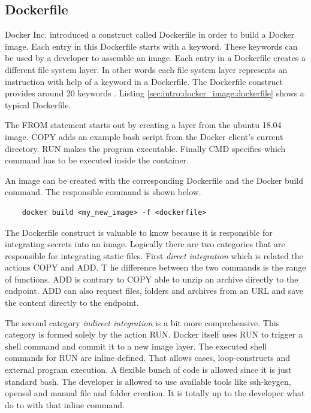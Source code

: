 \subsection{Dockerfile}
\label{sec:intro:docker_image:docker_img:dockerfile}
Docker Inc. introduced a construct called Dockerfile in order to build a Docker image.
Each entry in this Dockerfile starts with a keyword. 
These keywords can be used by a developer to assemble an image. 
Each entry in a Dockerfile creates a different file system layer. 
In other words each file system layer represents an instruction with help of a keyword in a Dockerfile.
The Dockerfile construct provides around 20 keywords \cite{dockerfile_ref}.
Listing \ref{sec:intro:docker_image:dockerfile} shows a typical Dockerfile.

The FROM statement starts out by creating a layer from the ubuntu 18.04 image. 
COPY adds an example bash script from the Docker client’s current directory. 
RUN makes the program executable. 
Finally CMD specifies which command has to be executed inside the container.

An image can be created with the corresponding Dockerfile and the Docker build command. The responsible command is shown below.
\begin{lstlisting}
	docker build <my_new_image> -f <dockerfile>
\end{lstlisting}
The Dockerfile construct is valuable to know because it is responsible for integrating secrets into an image. 
Logically there are two categories that are responsible for integrating static files.
First \textit{direct integration} which is related the actions COPY and ADD. T
he difference between the two commands is the range of functions. 
ADD is contrary to COPY able to unzip an archive directly to the endpoint.
ADD can also request files, folders and archives from an URL and save the content directly to the endpoint.

The second category \textit{indirect integration} is a bit more comprehensive. 
This category is formed solely by the action RUN.
Docker itself uses RUN to trigger a shell command and commit it to a new image layer.
The executed shell commands for RUN are inline defined. That allows cases, loop-constructs and external program execution. 
A flexible bunch of code is allowed since it is just standard bash. 
The developer is allowed to use available tools like ssh-keygen, openssl and manual file and folder creation.
It is totally up to the developer what do to with that inline command. 

